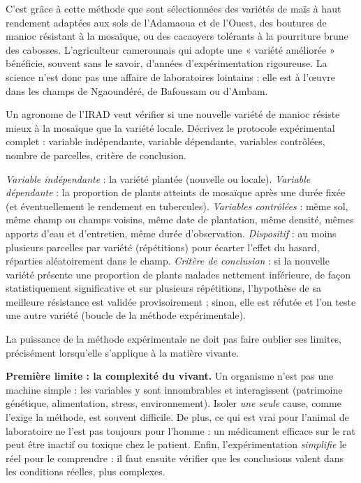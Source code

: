 \documentclass[11pt]{article}
\newcounter{popsec}
\newcounter{popsub}
\newcommand{\courssub}[1]{%
  \stepcounter{popsub}%
  \par\vspace{9pt}\noindent{\popxbold\fontsize{11.5}{13}\selectfont\color{popink}{\color{poporange}\thepopsec.\thepopsub}\hspace{6pt}#1}\par\nopagebreak\vspace{4pt}
}
\begin{document}
C'est grâce à cette méthode que sont sélectionnées des variétés de maïs à haut rendement adaptées aux sols de l'Adamaoua et de l'Ouest, des boutures de manioc résistant à la mosaïque, ou des cacaoyers tolérants à la pourriture brune des cabosses. L'agriculteur camerounais qui adopte une « variété améliorée » bénéficie, souvent sans le savoir, d'années d'expérimentation rigoureuse. La science n'est donc pas une affaire de laboratoires lointains : elle est à l'œuvre dans les champs de Ngaoundéré, de Bafoussam ou d'Ambam.

\begin{exercice}
Un agronome de l'IRAD veut vérifier si une nouvelle variété de manioc résiste mieux à la mosaïque que la variété locale. Décrivez le protocole expérimental complet : variable indépendante, variable dépendante, variables contrôlées, nombre de parcelles, critère de conclusion.
\end{exercice}

\begin{corrige}
\emph{Variable indépendante} : la variété plantée (nouvelle ou locale). \emph{Variable dépendante} : la proportion de plants atteints de mosaïque après une durée fixée (et éventuellement le rendement en tubercules). \emph{Variables contrôlées} : même sol, même champ ou champs voisins, même date de plantation, même densité, mêmes apports d'eau et d'entretien, même durée d'observation. \emph{Dispositif} : au moins plusieurs parcelles par variété (répétitions) pour écarter l'effet du hasard, réparties aléatoirement dans le champ. \emph{Critère de conclusion} : si la nouvelle variété présente une proportion de plants malades nettement inférieure, de façon statistiquement significative et sur plusieurs répétitions, l'hypothèse de sa meilleure résistance est validée provisoirement ; sinon, elle est réfutée et l'on teste une autre variété (boucle de la méthode expérimentale).
\end{corrige}

\courssub{Les limites de l'expérimentation sur le vivant}

La puissance de la méthode expérimentale ne doit pas faire oublier ses limites, précisément lorsqu'elle s'applique à la matière vivante.

\textbf{Première limite : la complexité du vivant.} Un organisme n'est pas une machine simple : les variables y sont innombrables et interagissent (patrimoine génétique, alimentation, stress, environnement). Isoler \emph{une seule} cause, comme l'exige la méthode, est souvent difficile. De plus, ce qui est vrai pour l'animal de laboratoire ne l'est pas toujours pour l'homme : un médicament efficace sur le rat peut être inactif ou toxique chez le patient. Enfin, l'expérimentation \emph{simplifie} le réel pour le comprendre : il faut ensuite vérifier que les conclusions valent dans les conditions réelles, plus complexes.
\end{document}
